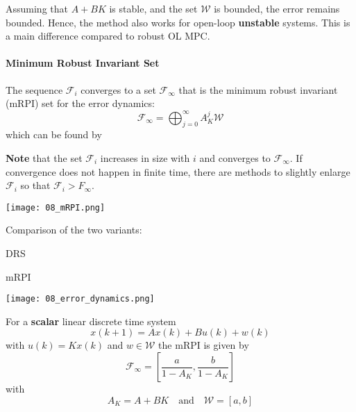 Assuming that $A+BK$ is stable, and the set $\mathcal{W}$ is bounded, the error remains bounded. Hence, the method also works for open-loop \textbf{unstable} systems. This is a main difference compared to robust OL MPC.

\paragraph{Minimum Robust Invariant Set}

The sequence $\mathcal{F}_i$ converges to a set $\mathcal{F}_\infty$ that is the minimum robust invariant (mRPI) set for the error dynamics:
\begin{equation*}
    \mathcal{F}_\infty = \bigoplus_{j=0}^{\infty}A_{K}^{j}\mathcal{W}
\end{equation*}
which can be found by
\noindent{}

\textbf{Note} that the set $\mathcal{F}_i$ increases in size with $i$ and converges to $\mathcal{F}_\infty$. If convergence does not happen in finite time, there are methods to slightly enlarge $\mathcal{F}_i$ so that $\mathcal{F}_i>F_\infty$.

\begin{center}
    \texttt{[image: 08\_mRPI.png]}
\end{center}

Comparison of the two variants:

\begin{minipage}[t]{0.49\linewidth}
    \centering
    DRS
\end{minipage}
\begin{minipage}[t]{0.49\linewidth}
    \centering
    mRPI
\end{minipage}
\begin{center}
    \texttt{[image: 08\_error\_dynamics.png]}
\end{center}

\newpar{}

For a \textbf{scalar} linear discrete time system
\begin{equation*}
    x(k+1) = Ax(k) +Bu(k) + w(k)
\end{equation*}
with $u(k) = K x(k)$ and $w\in\mathcal{W}$ the mRPI is given by
\begin{equation*}
    \mathcal{F}_\infty = \left[\frac{a}{1-A_K}, \frac{b}{1-A_K}\right]
\end{equation*}
with
\begin{equation*}
    A_K = A + BK \quad \text{and} \quad \mathcal{W}=\left[a, b\right]
\end{equation*}

